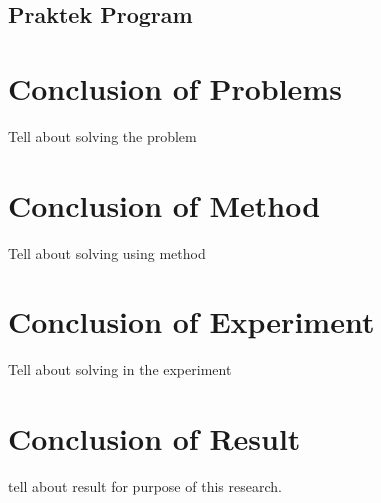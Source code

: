 \subsection{Praktek Program}

\section{Conclusion of Problems}
Tell about solving the problem

\section{Conclusion of Method}
Tell about solving using method

\section{Conclusion of Experiment}
Tell about solving in the experiment

\section{Conclusion of Result}
tell about result for purpose of this research.

